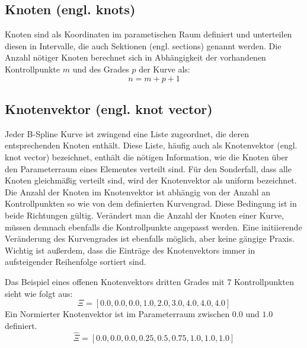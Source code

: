 \documentclass[german,a4paper,12pt,oneside]{scrbook}
\theoremstyle{definition}
\theoremstyle{definition}
\theoremstyle{definition}
\theoremstyle{definition}
\theoremstyle{definition}
\theoremstyle{definition}
\begin{document}
\subsection{Knoten (engl. knots)}
\label{subsec: Knoten}
Knoten sind als Koordinaten im parametischen Raum definiert und unterteilen diesen in Intervalle, die auch Sektionen (engl. sections) genannt werden. Die Anzahl nötiger Knoten berechnet sich in Abhängigkeit der vorhandenen Kontrollpunkte $m$ und des Grades $p$ der Kurve als: 
\begin{equation*}
        n = m + p + 1
\end{equation*}

\subsection{Knotenvektor (engl. knot vector)}
\label{subsec:knot vector}
Jeder B-Spline Kurve ist zwingend eine Liste zugeordnet, die deren entsprechenden Knoten enthält. Diese Liste, häufig auch als Knotenvektor (engl. knot vector) bezeichnet, enthält die nötigen Information, wie die Knoten über den Parameterraum eines Elementes verteilt sind. Für den Sonderfall, dass alle Knoten gleichmäßig verteilt sind, wird der Knotenvektor als uniform bezeichnet.  Die Anzahl der Knoten im Knotenvektor ist abhängig von der Anzahl an Kontrollpunkten so wie von dem definierten Kurvengrad. Diese Bedingung ist in beide Richtungen gültig. Verändert man die Anzahl der Knoten einer Kurve, müssen demnach ebenfalls die Kontrollpunkte angepasst werden. Eine initiierende Veränderung des Kurvengrades ist ebenfalls möglich, aber keine gängige Praxis. Wichtig ist außerdem, dass die Einträge des Knotenvektors immer in aufsteigender Reihenfolge sortiert sind. 

Das Beispiel eines offenen Knotenvektors dritten Grades mit 7 Kontrollpunkten sieht wie folgt aus:
\begin{equation*}
    \Xi = [0.0, 0.0, 0.0, 1.0, 2.0, 3.0, 4.0, 4.0, 4.0]
\end{equation*}
Ein Normierter Knotenvektor ist im Parameterraum zwischen $0.0$ und $1.0$ definiert. 
\begin{equation*}
    \hat{\Xi} = [0.0, 0.0, 0.0, 0.25, 0.5, 0.75, 1.0, 1.0, 1.0]
\end{equation*}


\end{document}
